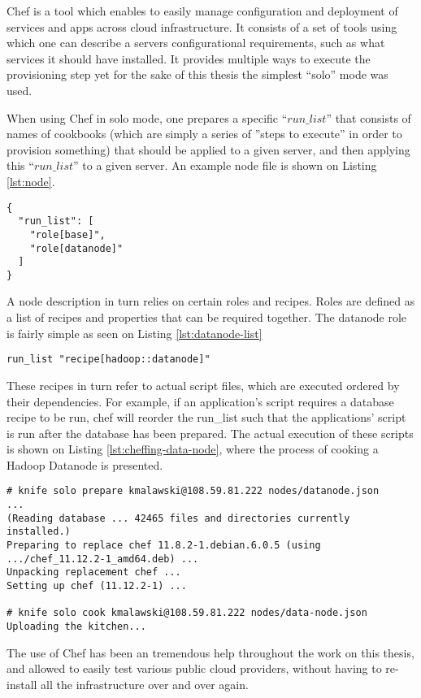Chef is a tool which enables to easily manage configuration and deployment of services and apps across cloud infrastructure. It consists of a set of tools using which one can describe a servers configurational requirements, such as what services it should have installed. It provides multiple ways to execute the provisioning step yet for the sake of this thesis the simplest ``solo'' mode was used.

When using Chef in solo mode, one prepares a specific ``$run\_list$'' that consists of names of cookbooks (which are simply a series of ''steps to execute'' in order to provision something) that should be applied to a given server, and then applying this ``$run\_list$'' to a given server. An example node file is shown on Listing \ref{lst:node}.

\begin{lstlisting}[caption={Example data-node.json file},label={lst:node}]
{
  "run_list": [
    "role[base]",
    "role[datanode]"
  ]
}
\end{lstlisting}

A node description in turn relies on certain roles and recipes. Roles are defined as a list of recipes and properties that can be required together. The datanode role is fairly simple as seen on Listing \ref{lst:datanode-list}

\begin{lstlisting}[caption={Example roles/datanode.rb file}, label={lst:datanode-list}]
run_list "recipe[hadoop::datanode]"
\end{lstlisting}

These recipes in turn refer to actual script files, which are executed ordered by their dependencies. For example, if an application's script requires a database recipe to be run, chef will reorder the run\_list such that the applications' script is run after the database has been prepared. The actual execution of these scripts is shown on Listing \ref{lst:cheffing-data-node}, where the process of cooking a Hadoop Datanode is presented.

\begin{lstlisting}[caption={Preparing and Cooking a server with in order to prepare it for becoming a Hadoop data-node},label={lst:cheffing-data-node}]
# knife solo prepare kmalawski@108.59.81.222 nodes/datanode.json
...
(Reading database ... 42465 files and directories currently installed.)
Preparing to replace chef 11.8.2-1.debian.6.0.5 (using .../chef_11.12.2-1_amd64.deb) ...
Unpacking replacement chef ...
Setting up chef (11.12.2-1) ...

# knife solo cook kmalawski@108.59.81.222 nodes/data-node.json
Uploading the kitchen...

\end{lstlisting}

The use of Chef has been an tremendous help throughout the work on this thesis, and allowed to easily test various public cloud providers, without having to re-install all the infrastructure over and over again.












